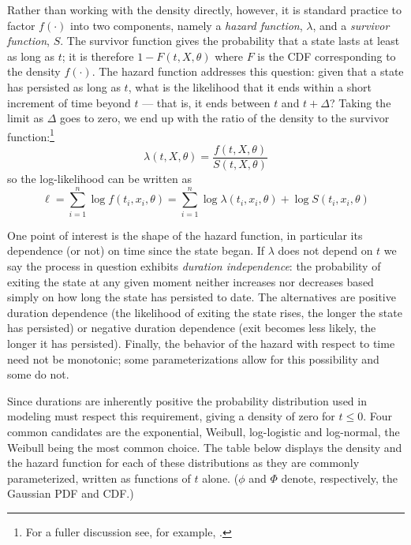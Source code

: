 Rather than working with the density directly, however, it is standard
practice to factor $f(\cdot)$ into two components, namely a
\emph{hazard function}, $\lambda$, and a \emph{survivor function},
$S$.  The survivor function gives the probability that a state lasts
at least as long as $t$; it is therefore $1 - F(t, X, \theta)$ where
$F$ is the CDF corresponding to the density $f(\cdot)$. The hazard
function addresses this question: given that a state has persisted as
long as $t$, what is the likelihood that it ends within a short
increment of time beyond $t$ --- that is, it ends between $t$ and $t +
\Delta$?  Taking the limit as $\Delta$ goes to zero, we end up with
the ratio of the density to the survivor function:\footnote{For a
  fuller discussion see, for example, \cite{davidson-mackinnon04}.}
\begin{equation}
\label{eq:surv-decomp}
\lambda(t, X, \theta) = \frac{f(t, X, \theta)}{S(t, X, \theta)}
\end{equation}
so the log-likelihood can be written as
\begin{equation}
\label{eq:surv-loglik}
\ell = \sum_{i=1}^n \log f(t_i, x_i, \theta) = 
\sum_{i=1}^n \log \lambda(t_i, x_i, \theta) + 
\log S(t_i, x_i, \theta)
\end{equation}

One point of interest is the shape of the hazard function, in
particular its dependence (or not) on time since the state began.  If
$\lambda$ does not depend on $t$ we say the process in question exhibits
\emph{duration independence}: the probability of exiting the state at
any given moment neither increases nor decreases based simply on how
long the state has persisted to date. The alternatives are positive
duration dependence (the likelihood of exiting the state rises, the
longer the state has persisted) or negative duration dependence (exit
becomes less likely, the longer it has persisted).  Finally, the
behavior of the hazard with respect to time need not be monotonic;
some parameterizations allow for this possibility and some do not.

Since durations are inherently positive the probability distribution
used in modeling must respect this requirement, giving a density of
zero for $t \leq 0$.  Four common candidates are the exponential,
Weibull, log-logistic and log-normal, the Weibull being the most
common choice. The table below displays the density and the hazard
function for each of these distributions as they are commonly
parameterized, written as functions of $t$ alone. ($\phi$ and $\Phi$
denote, respectively, the Gaussian PDF and CDF.)

